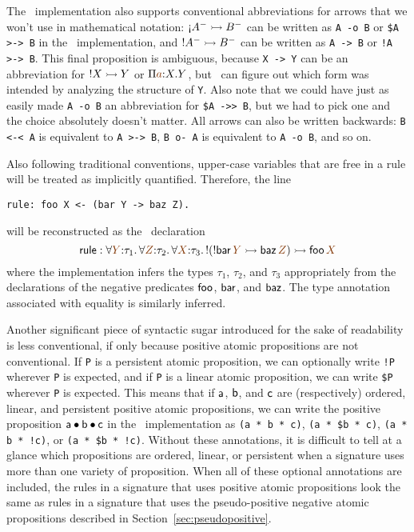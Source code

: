 The \sls~implementation also supports conventional abbreviations for
arrows that we won't use in mathematical notation: ${\gnab}A^- \lefti
B^-$ can be written as \verb|A -o B| or \verb|$A >-> B| in the
\sls~implementation, and ${!}A^- \rightarrowtail B^-$ can be written as
\verb|A -> B| or \verb|!A >-> B|.  This final proposition is
ambiguous, because \verb|X -> Y| can be an abbreviation for ${!}X
\rightarrowtail Y$ or $\Pi \lf{a}{:}X. Y$, but \sls~can figure out which form
was intended by analyzing the structure of
\verb|Y|. Also note that we could have just as easily made
\verb|A -o B| an abbreviation for \verb|$A ->> B|, but we had to pick
one and the choice absolutely doesn't matter.  All arrows can also be
written backwards: \verb|B <-< A| is equivalent to \verb|A >-> B|,
\verb|B o- A| is equivalent to \verb|A -o B|, and so on. 

Also
following traditional conventions, upper-case variables that are free
in a rule will be treated as implicitly quantified. Therefore, the
line \bigskip
\begin{verbatim}
rule: foo X <- (bar Y -> baz Z).
\end{verbatim}
\bigskip
will be reconstructed as the \sls~declaration 
\[{\sf rule} : \forall\lf{Y}{:}\tau_1.\,\forall\lf{Z}{:}\tau_2.\,\forall\lf{X}{:}\tau_3.\,{!}({!}{\sf bar}\,\lf{Y} \lefti {\sf baz}\,\lf{Z}) \lefti {\sf foo}\,\lf{X}\] 
%
where the implementation infers the types $\tau_1$, $\tau_2$, and
$\tau_3$ appropriately from the declarations of the negative
predicates ${\sf foo}$, ${\sf bar}$, and ${\sf baz}$. The type annotation
associated with equality is similarly inferred.

Another significant piece of syntactic sugar introduced for 
the sake of readability is less conventional, if only because
positive atomic propositions are not conventional. If \verb|P| is a
persistent atomic proposition, we can optionally write \verb|!P|
wherever \verb|P| is expected, and if \verb|P| is a linear atomic
proposition, we can write \verb|$P| wherever \verb|P| is
expected. This means that if ${\sf a}$, ${\sf b}$, and ${\sf c}$ are
(respectively) ordered, linear, and persistent positive atomic
propositions, we can write the positive proposition ${\sf a} \mathbin{\bullet}
{\sf b} \mathbin{\bullet} {\sf c}$ in the \sls~implementation as
\verb|(a * b * c)|, \verb|(a * $b * c)|, \verb|(a * b * !c)|, or
\verb|(a * $b * !c)|. Without these annotations, it is difficult to
tell at a glance which propositions are ordered, linear, or persistent
when a signature uses more than one variety of
proposition. When all of these
optional annotations are included, the rules in a signature that uses
positive atomic propositions look the same as rules in a signature
that uses the pseudo-positive negative atomic propositions described
in Section~\ref{sec:pseudopositive}. 


